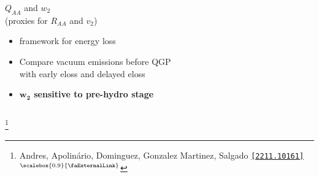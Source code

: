 \documentclass[aspectratio=169,11pt,usenames,dvipsnames]{beamer}
\renewcommand{\thefootnote}{\color{customblue}\faPaperPlaneO}
\newcommand\blfootnote[1]{%
  \begingroup
  \renewcommand\thefootnote{}\footnote{#1}%
  \addtocounter{footnote}{-1}%
  \endgroup
}
\begin{document}
\begin{frame}[t,noframenumbering]
\begin{columns}[onlytextwidth,t]
\begin{center}
            {\Large\color{isgold} $Q_{AA}$ and $w_2$\\{\scriptsize (proxies for $R_{AA}$ and $v_2$)} \\[10pt]}
            \footnotesize
                \begin{itemize}
                    \item {\color{lightgray}{\bfseries BDMPS-Z} framework for energy loss}
                    \item {\color{lightgray}Compare {\color{Red}vacuum emissions before QGP}\\ with {\color{OliveGreen}early eloss} and {\color{RoyalBlue}delayed eloss}}
                    \\[15pt]
                    \item {\color{destacado}\bfseries\normalsize{$\boldsymbol{w_2}$ sensitive to pre-hydro stage}}
                \end{itemize}
        \end{center}
    \end{columns}
    \blfootnote{\scriptsize Andres, Apolinário, Dominguez, Gonzalez Martinez, Salgado \href{https://arxiv.org/abs/2211.10161}{\color{palgold}\texttt{[2211.10161]}$^\text{\scalebox{0.9}{\faExternalLink}}$}}
\end{frame}

\end{document}
